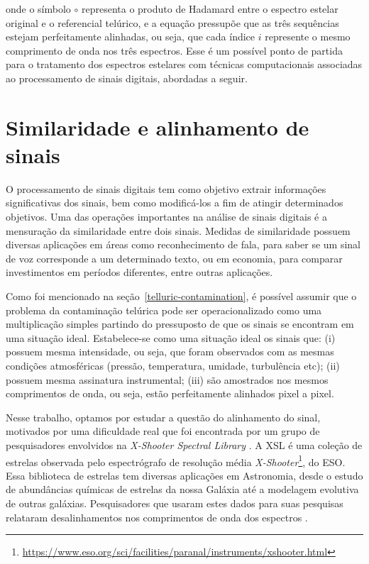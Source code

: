 \noindent onde o símbolo $\circ$ representa o produto de Hadamard entre o espectro estelar original e o referencial telúrico, e a equação pressupõe que as três sequências estejam perfeitamente alinhadas, ou seja, que cada índice $i$ represente o mesmo comprimento de onda nos três espectros. Esse é um possível ponto de partida para o tratamento dos espectros estelares com técnicas computacionais associadas ao processamento de sinais digitais, abordadas a seguir.


\section{Similaridade e alinhamento de sinais}\label{similarity-and-signal-alignment}

O processamento de sinais digitais tem como objetivo extrair informações significativas dos sinais, bem como modificá-los a fim de atingir determinados objetivos. Uma das operações importantes na análise de sinais digitais é a mensuração da similaridade entre dois sinais. Medidas de similaridade possuem diversas aplicações em áreas como reconhecimento de fala, para saber se um sinal de voz corresponde a um determinado texto, ou em economia, para comparar investimentos em períodos diferentes, entre outras aplicações.

Como foi mencionado na seção~\ref{telluric-contamination}, é possível assumir que o problema da contaminação telúrica pode ser operacionalizado como uma multiplicação simples partindo do pressuposto de que os sinais se encontram em uma situação ideal. Estabelece-se como uma situação ideal os sinais que: (i) possuem mesma intensidade, ou seja, que foram observados com as mesmas condições atmosféricas (pressão, temperatura, umidade, turbulência etc); (ii) possuem mesma assinatura instrumental; (iii) são amostrados nos mesmos comprimentos de onda, ou seja, estão perfeitamente alinhados pixel a pixel. 

Nesse trabalho, optamos por estudar a questão do alinhamento do sinal, motivados por uma dificuldade real que foi encontrada por um grupo de pesquisadores envolvidos na \textit{X-Shooter Spectral Library} \citep[][XSL]{Chen2014TheXS}. A XSL é uma coleção de estrelas observada pelo espectrógrafo de resolução média \textit{X-Shooter}\footnote{\url{https://www.eso.org/sci/facilities/paranal/instruments/xshooter.html}}, do ESO. Essa biblioteca de estrelas tem diversas aplicações em Astronomia, desde o estudo de abundâncias químicas de estrelas da nossa Galáxia até a modelagem evolutiva de outras galáxias. Pesquisadores que usaram estes dados para suas pesquisas relataram desalinhamentos nos comprimentos de onda dos espectros \citep{unpublished-xshooter-data-release, wavelength-shifts}.

